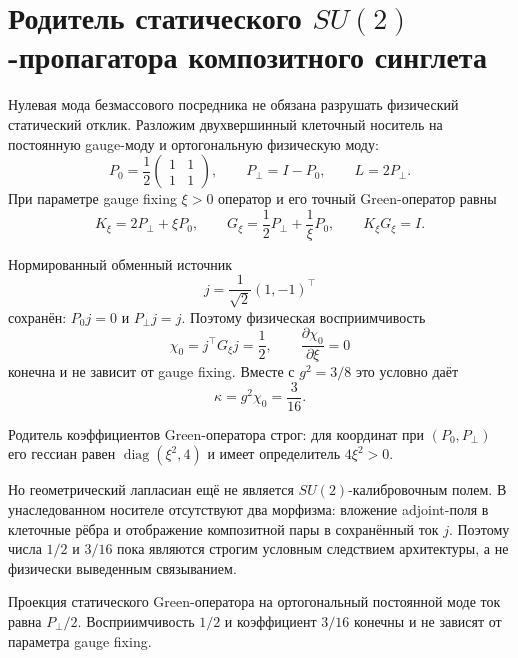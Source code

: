 \chapter{Родитель статического
\texorpdfstring{$SU(2)$}{SU(2)}-пропагатора композитного синглета}
\label{ch:v10-discrete-resolution-su2-static-mediator}

Нулевая мода безмассового посредника не обязана разрушать физический
статический отклик. Разложим двухвершинный клеточный носитель на постоянную
gauge-моду и ортогональную физическую моду:
\begin{equation}
 P_0=\frac12\begin{pmatrix}1&1\\1&1\end{pmatrix},\qquad
 P_\perp=I-P_0,\qquad L=2P_\perp.
\end{equation}
При параметре gauge fixing $\xi>0$ оператор и его точный Green-оператор
равны
\begin{equation}
 K_\xi=2P_\perp+\xi P_0,
 \qquad G_\xi=\frac12P_\perp+\frac1\xi P_0,
 \qquad K_\xi G_\xi=I.
\end{equation}

Нормированный обменный источник
\begin{equation}
 j=\frac1{\sqrt2}(1,-1)^\top
\end{equation}
сохранён: $P_0j=0$ и $P_\perp j=j$. Поэтому физическая восприимчивость
\begin{equation}
 \chi_0=j^\top G_\xi j=\frac12,
 \qquad \frac{\partial\chi_0}{\partial\xi}=0
\end{equation}
конечна и не зависит от gauge fixing. Вместе с $g^2=3/8$ это условно даёт
\begin{equation}
 \kappa=g^2\chi_0=\frac3{16}.
\end{equation}

Родитель коэффициентов Green-оператора строг: для координат при
$(P_0,P_\perp)$ его гессиан равен $\operatorname{diag}(\xi^2,4)$ и имеет
определитель $4\xi^2>0$.

Но геометрический лапласиан ещё не является $SU(2)$-калибровочным полем.
В унаследованном носителе отсутствуют два морфизма: вложение adjoint-поля в
клеточные рёбра и отображение композитной пары в сохранённый ток $j$.
Поэтому числа $1/2$ и $3/16$ пока являются строгим условным следствием
архитектуры, а не физически выведенным связыванием.

\begin{theorem}
Проекция статического Green-оператора на ортогональный постоянной моде ток
равна $P_\perp/2$. Восприимчивость $1/2$ и коэффициент $3/16$ конечны и не
зависят от параметра gauge fixing.
\end{theorem}

